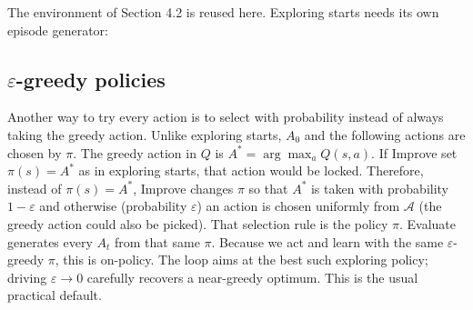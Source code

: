 The environment of Section 4.2 is reused here. Exploring starts needs its own episode generator:




\subsection{$\varepsilon$-greedy policies}

Another way to try every action is to select with probability instead of always taking the greedy action. Unlike exploring starts, $A_0$ and the following actions are chosen by $\pi$. The greedy action in $Q$ is $A^*=\arg\max_a Q(s,a)$. If Improve set $\pi(s)=A^*$ as in exploring starts, that action would be locked. Therefore, instead of $\pi(s)=A^*$, Improve changes $\pi$ so that $A^*$ is taken with probability $1-\varepsilon$ and otherwise (probability $\varepsilon$) an action is chosen uniformly from $\mathcal{A}$ (the greedy action could also be picked). That selection rule is the policy $\pi$. Evaluate generates every $A_t$ from that same $\pi$. Because we act and learn with the same $\varepsilon$-greedy $\pi$, this is on-policy. The loop aims at the best such exploring policy; driving $\varepsilon\to 0$ carefully recovers a near-greedy optimum. This is the usual practical default.
